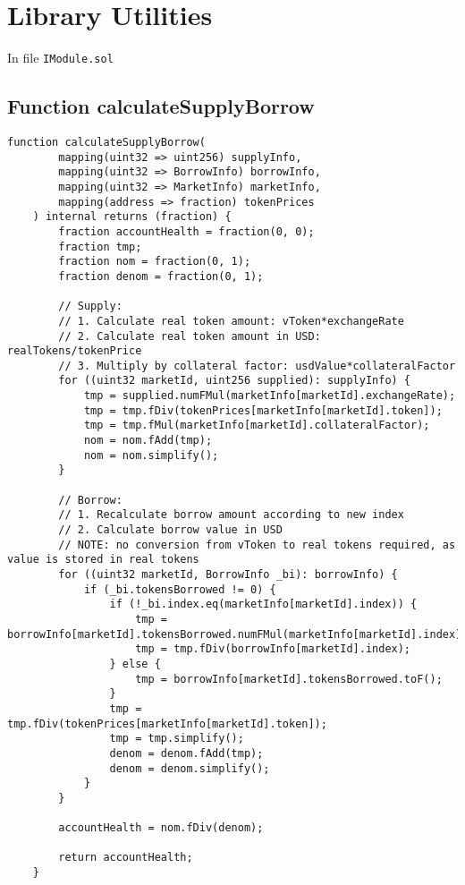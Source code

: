 
\bigskip

\section{Library Utilities}

In file {\tt IModule.sol}

\subsection{Function calculateSupplyBorrow}

\begin{lstlisting}[firstnumber=90]
    function calculateSupplyBorrow(
        mapping(uint32 => uint256) supplyInfo,
        mapping(uint32 => BorrowInfo) borrowInfo,
        mapping(uint32 => MarketInfo) marketInfo,
        mapping(address => fraction) tokenPrices
    ) internal returns (fraction) {
        fraction accountHealth = fraction(0, 0);
        fraction tmp;
        fraction nom = fraction(0, 1);
        fraction denom = fraction(0, 1);

        // Supply:
        // 1. Calculate real token amount: vToken*exchangeRate
        // 2. Calculate real token amount in USD: realTokens/tokenPrice
        // 3. Multiply by collateral factor: usdValue*collateralFactor
        for ((uint32 marketId, uint256 supplied): supplyInfo) {
            tmp = supplied.numFMul(marketInfo[marketId].exchangeRate);
            tmp = tmp.fDiv(tokenPrices[marketInfo[marketId].token]);
            tmp = tmp.fMul(marketInfo[marketId].collateralFactor);
            nom = nom.fAdd(tmp);
            nom = nom.simplify();
        }

        // Borrow:
        // 1. Recalculate borrow amount according to new index
        // 2. Calculate borrow value in USD
        // NOTE: no conversion from vToken to real tokens required, as value is stored in real tokens
        for ((uint32 marketId, BorrowInfo _bi): borrowInfo) {
            if (_bi.tokensBorrowed != 0) {
                if (!_bi.index.eq(marketInfo[marketId].index)) {
                    tmp = borrowInfo[marketId].tokensBorrowed.numFMul(marketInfo[marketId].index);
                    tmp = tmp.fDiv(borrowInfo[marketId].index);
                } else {
                    tmp = borrowInfo[marketId].tokensBorrowed.toF();
                }
                tmp = tmp.fDiv(tokenPrices[marketInfo[marketId].token]);
                tmp = tmp.simplify();
                denom = denom.fAdd(tmp);
                denom = denom.simplify();
            }
        }

        accountHealth = nom.fDiv(denom);

        return accountHealth;
    }
\end{lstlisting}

